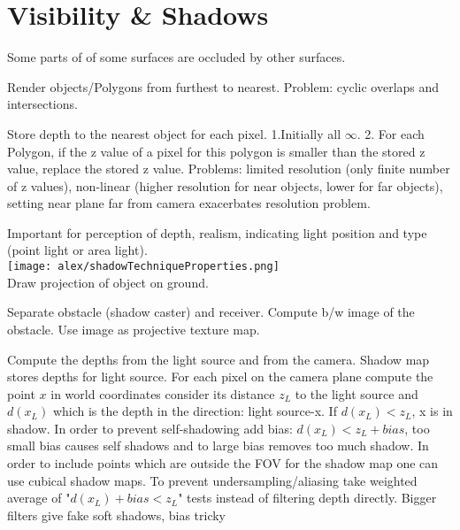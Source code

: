 \section{Visibility \& Shadows}

 Some parts of of some surfaces are occluded by other surfaces.

 Render objects/Polygons from furthest to nearest. Problem: cyclic overlaps and intersections.

 Store depth to the nearest object for each pixel. 1.Initially all $\infty$. 2. For each Polygon, if the z value of a pixel for this polygon is smaller than the stored z value, replace the stored z value. Problems: limited resolution (only finite number of z values), non-linear (higher resolution for near objects, lower for far objects), setting near plane far from camera exacerbates resolution problem.

 Important for perception of depth, realism, indicating light position and type (point light or area light).\\
\texttt{[image: alex/shadowTechniqueProperties.png]}\\
 Draw projection of object on ground.

 Separate obstacle (shadow caster) and receiver. Compute b/w image of the obstacle. Use image as projective texture map.

 Compute the depths from the light source and from the camera. Shadow map stores depths for light source. For each pixel on the camera plane compute the point $x$ in world coordinates consider its distance $z_L$ to the light source and $d(x_L)$ which is the depth in the direction: light source-x. If $d(x_L) < z_L$, x is in shadow. In order to prevent self-shadowing add bias: $d(x_L) < z_L + bias$, too small bias causes self shadows and to large bias removes too much shadow. In order to include points which are outside the FOV for the shadow map one can use cubical shadow maps. To prevent undersampling/aliasing take weighted average of "$d(x_L) + bias < z_L$" tests instead of filtering depth directly. Bigger filters give fake soft shadows, bias tricky


